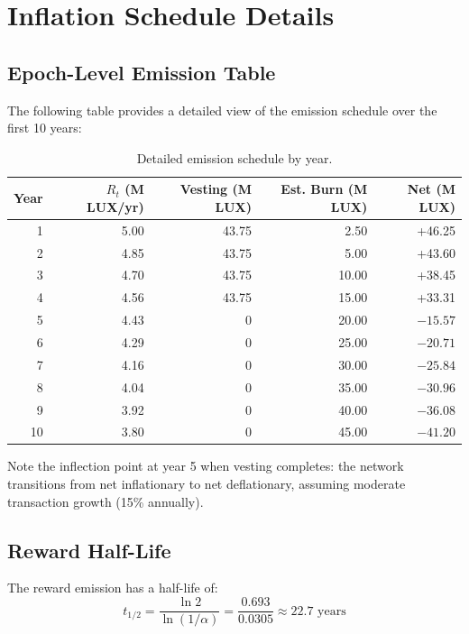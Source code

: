 \section{Inflation Schedule Details}
\label{sec:inflation}

\subsection{Epoch-Level Emission Table}

The following table provides a detailed view of the emission schedule over the first 10 years:

\begin{table}[H]
\centering
\caption{Detailed emission schedule by year.}
\label{tab:emissions}
\begin{tabular}{rrrrr}
\toprule
\textbf{Year} & \textbf{$R_t$ (M LUX/yr)} & \textbf{Vesting (M LUX)} & \textbf{Est. Burn (M LUX)} & \textbf{Net (M LUX)} \\
\midrule
1 & 5.00 & 43.75 & 2.50 & +46.25 \\
2 & 4.85 & 43.75 & 5.00 & +43.60 \\
3 & 4.70 & 43.75 & 10.00 & +38.45 \\
4 & 4.56 & 43.75 & 15.00 & +33.31 \\
5 & 4.43 & 0 & 20.00 & $-15.57$ \\
6 & 4.29 & 0 & 25.00 & $-20.71$ \\
7 & 4.16 & 0 & 30.00 & $-25.84$ \\
8 & 4.04 & 0 & 35.00 & $-30.96$ \\
9 & 3.92 & 0 & 40.00 & $-36.08$ \\
10 & 3.80 & 0 & 45.00 & $-41.20$ \\
\bottomrule
\end{tabular}
\end{table}

Note the inflection point at year 5 when vesting completes: the network transitions from net inflationary to net deflationary, assuming moderate transaction growth (15\% annually).

\subsection{Reward Half-Life}

The reward emission has a half-life of:
\begin{equation}
    t_{1/2} = \frac{\ln 2}{\ln(1/\alpha)} = \frac{0.693}{0.0305} \approx 22.7 \text{ years}
\end{equation}

